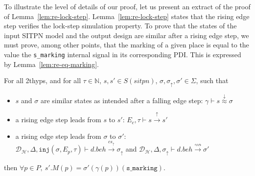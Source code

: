 To illustrate the level of details of our proof, let us present an
extract of the proof of
Lemma~\ref{lem:re-lock-step}. Lemma~\ref{lem:re-lock-step} states that
the rising edge step verifies the lock-step simulation property. To
prove that the states of the input SITPN model and the output design
are similar after a rising edge step, we must prove, among other
points, that the marking of a given place is equal to the value the
\texttt{s\_marking} internal signal in its corresponding PDI. This is
expressed by Lemma~\ref{lem:re-eq-marking}.

\begin{lemma}
  \label{lem:re-eq-marking}
  For all \hm2thyps{}, and for all $\tau\in\mathbb{N}$,
  $s,s'\in{}S(sitpn)$, $\sigma,\sigma_\uparrow,\sigma'\in\Sigma$, such
  that
  \begin{itemize}
  \item $s$ and $\sigma$ are similar states as intended after a
    falling edge step:
    $\gamma\vdash{}s\stackrel{\downarrow}{\approx}\sigma$
  \item a rising edge step leads from $s$ to $s'$:
    $E_c,\tau\vdash{}s\xrightarrow{\uparrow}s'$
  \item a rising edge step leads from $\sigma$ to $\sigma'$:\\
    $\mathcal{D}_\mathcal{H},\Delta,\mathtt{inj}(\sigma,E_p,\tau)\vdash{}d.beh\xrightarrow{cs_{\uparrow}}\sigma_{\uparrow}$
    and
    $\mathcal{D}_\mathcal{H},\Delta,\sigma_{\uparrow}\vdash{}d.beh\xrightarrow{\rightsquigarrow}\sigma'$
  \end{itemize}
  then
  $\forall{}p\in{}P,~s'.M(p)=\sigma'(\gamma(p))(\mathtt{s\_marking})$.
  
\end{lemma}

